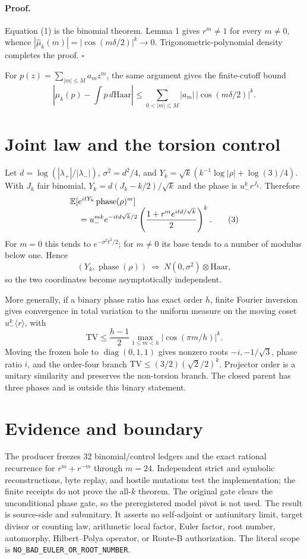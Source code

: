 \documentclass[10pt]{article}
\begin{document}
\paragraph{Proof.}
Equation (1) is the binomial theorem.  Lemma 1 gives $r^m\ne1$ for every
$m\ne0$, whence
$|\widehat\mu_k(m)|=|\cos(m\delta/2)|^k\to0$.  Trigonometric-polynomial
density completes the proof. \hfill$\square$

For $p(z)=\sum_{|m|\le M}a_mz^m$, the same argument gives the finite-cutoff
bound
\[
 |\mu_k(p)-\!\int p\,d\mathrm{Haar}|
 \le\sum_{0<|m|\le M}|a_m|\,|\cos(m\delta/2)|^k.                 \tag{2}
\]

\section{Joint law and the torsion control}
Let $d=\log(|\lambda_+|/|\lambda_-|)$, $\sigma^2=d^2/4$, and
$Y_k=\sqrt{k}(k^{-1}\log|\rho|+\log(3)/4)$.  With $J_k$ fair binomial,
$Y_k=d(J_k-k/2)/\sqrt{k}$ and the phase is $u_-^kr^{J_k}$.  Therefore
\begin{align}
 &\mathbb E[e^{itY_k}\operatorname{phase}(\rho)^m]\notag\\[-2mm]
 &\quad=u_-^{mk}e^{-itd\sqrt{k}/2}
 \left(\frac{1+r^me^{itd/\sqrt{k}}}{2}\right)^k.                \tag{3}
\end{align}
For $m=0$ this tends to $e^{-\sigma^2t^2/2}$; for $m\ne0$ its
base tends to a number of modulus below one.  Hence
\[
 (Y_k,\operatorname{phase}(\rho))
 \ \Longrightarrow\ N(0,\sigma^2)\otimes\mathrm{Haar},          \tag{4}
\]
so the two coordinates become asymptotically independent.

More generally, if a binary phase ratio has exact order $h$, finite Fourier
inversion gives convergence in total variation to the uniform measure on the
moving coset $u_-^k\langle r\rangle$, with
\[
 \mathrm{TV}\le\frac{h-1}{2}
 \max_{1\le m<h}|\cos(\pi m/h)|^k.                              \tag{5}
\]
Moving the frozen hole to $\operatorname{diag}(0,1,1)$ gives nonzero roots
$-i,-1/\sqrt3$, phase ratio $i$, and the order-four branch
$\mathrm{TV}\le(3/2)(\sqrt2/2)^k$.  Projector order is a unitary similarity
and preserves the non-torsion branch.  The closed parent has three phases and
is outside this binary statement.

\section{Evidence and boundary}
The producer freezes 32 binomial/control ledgers and the exact rational
recurrence for $r^m+r^{-m}$ through $m=24$.  Independent strict and symbolic
reconstructions, byte replay, and hostile mutations test the implementation;
the finite receipts do not prove the all-$k$ theorem.  The original gate
clears the unconditional phase gate, so the preregistered model pivot is not
used.
The result is source-side and subunitary.  It asserts no self-adjoint or
antiunitary limit, target divisor or counting law, arithmetic local factor,
Euler factor, root number, automorphy, Hilbert--Polya operator, or Route-B
authorization.  The literal scope is
\texttt{NO\_BAD\_EULER\_OR\_ROOT\_NUMBER}.
\end{document}
